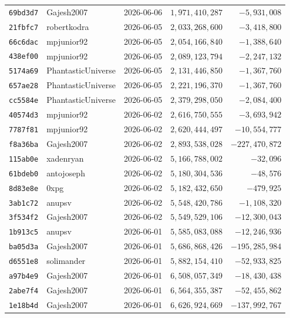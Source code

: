 {\begin{longtable}{@{}lllrr@{}}
\texttt{69bd3d7} & Gajesh2007 & 2026-06-06 & $1{,}971{,}410{,}287$ & $-5{,}931{,}008$\\
\texttt{21fbfc7} & robertkodra & 2026-06-05 & $2{,}033{,}268{,}600$ & $-3{,}418{,}800$\\
\texttt{66c6dac} & mpjunior92 & 2026-06-05 & $2{,}054{,}166{,}840$ & $-1{,}388{,}640$\\
\texttt{438ef00} & mpjunior92 & 2026-06-05 & $2{,}089{,}123{,}794$ & $-2{,}247{,}132$\\
\texttt{5174a69} & PhantasticUniverse & 2026-06-05 & $2{,}131{,}446{,}850$ & $-1{,}367{,}760$\\
\texttt{657ae28} & PhantasticUniverse & 2026-06-05 & $2{,}221{,}196{,}370$ & $-1{,}367{,}760$\\
\texttt{cc5584e} & PhantasticUniverse & 2026-06-05 & $2{,}379{,}298{,}050$ & $-2{,}084{,}400$\\
\texttt{40574d3} & mpjunior92 & 2026-06-02 & $2{,}616{,}750{,}555$ & $-3{,}693{,}942$\\
\texttt{7787f81} & mpjunior92 & 2026-06-02 & $2{,}620{,}444{,}497$ & $-10{,}554{,}777$\\
\texttt{f8a36ba} & Gajesh2007 & 2026-06-02 & $2{,}893{,}538{,}028$ & $-227{,}470{,}872$\\
\texttt{115ab0e} & xadenryan & 2026-06-02 & $5{,}166{,}788{,}002$ & $-32{,}096$\\
\texttt{61bdeb0} & antojoseph & 2026-06-02 & $5{,}180{,}304{,}536$ & $-48{,}576$\\
\texttt{8d83e8e} & 0xpg & 2026-06-02 & $5{,}182{,}432{,}650$ & $-479{,}925$\\
\texttt{3ab1c72} & anupsv & 2026-06-02 & $5{,}548{,}420{,}786$ & $-1{,}108{,}320$\\
\texttt{3f534f2} & Gajesh2007 & 2026-06-02 & $5{,}549{,}529{,}106$ & $-12{,}300{,}043$\\
\texttt{1b913c5} & anupsv & 2026-06-01 & $5{,}585{,}083{,}088$ & $-12{,}246{,}936$\\
\texttt{ba05d3a} & Gajesh2007 & 2026-06-01 & $5{,}686{,}868{,}426$ & $-195{,}285{,}984$\\
\texttt{d6551e8} & solimander & 2026-06-01 & $5{,}882{,}154{,}410$ & $-52{,}933{,}825$\\
\texttt{a97b4e9} & Gajesh2007 & 2026-06-01 & $6{,}508{,}057{,}349$ & $-18{,}430{,}438$\\
\texttt{2abe7f4} & Gajesh2007 & 2026-06-01 & $6{,}564{,}355{,}387$ & $-52{,}455{,}862$\\
\texttt{1e18b4d} & Gajesh2007 & 2026-06-01 & $6{,}626{,}924{,}669$ & $-137{,}992{,}767$\\

\end{longtable}}
